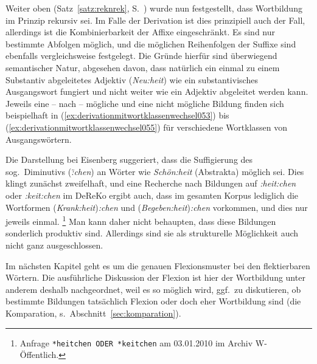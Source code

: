 Weiter oben (Satz~\ref{satz:reknrek}, S.~\pageref{satz:reknrek}) wurde nun festgestellt, dass Wortbildung im Prinzip rekursiv sei.
Im Falle der Derivation ist dies prinzipiell auch der Fall, allerdings ist die Kombinierbarkeit der Affixe eingeschränkt.
Es sind nur bestimmte Abfolgen möglich, und die möglichen Reihenfolgen der Suffixe sind ebenfalls vergleichsweise festgelegt.
Die Gründe hierfür sind überwiegend semantischer Natur, abgesehen davon, dass natürlich \zB ein einmal zu einem Substantiv abgeleitetes Adjektiv (\textit{Neu:heit}) wie ein substantivisches Ausgangswort fungiert und nicht weiter wie ein Adjektiv abgeleitet werden kann.
Jeweils eine -- nach \citealp{Eisenberg2013a} -- mögliche und eine nicht mögliche Bildung finden sich beispielhaft in (\ref{ex:derivationmitwortklassenwechsel053}) bis (\ref{ex:derivationmitwortklassenwechsel055}) für verschiedene Wortklassen von Ausgangswörtern.

\begin{exe}
\end{exe}


Die Darstellung bei Eisenberg suggeriert, dass die Suffigierung des sog.\ Diminutivs (\textit{\~:chen}) an Wörter wie \textit{Schön:heit} (Abstrakta) möglich sei.
Dies klingt zunächst zweifelhaft, und eine Recherche nach Bildungen auf \textit{:heit:chen} oder \textit{:keit:chen} im DeReKo ergibt auch, dass im gesamten Korpus lediglich die Wortformen (\textit{Krank:heit})\textit{:chen} und (\textit{Begeben:heit})\textit{:chen} vorkommen, und dies nur jeweils einmal.%
\footnote{Anfrage \texttt{*heitchen ODER *keitchen} am 03.01.2010 im Archiv W-Öffentlich.}
Man kann daher nicht behaupten, dass diese Bildungen sonderlich produktiv sind.
Allerdings sind sie als strukturelle Möglichkeit auch nicht ganz ausgeschlossen.

Im nächsten Kapitel geht es um die genauen Flexionsmuster bei den flektierbaren Wörtern.
Die ausführliche Diskussion der Flexion ist hier der Wortbildung unter anderem deshalb nachgeordnet, weil es so möglich wird, ggf.\ zu diskutieren, ob bestimmte Bildungen tatsächlich Flexion oder doch eher Wortbildung sind (\zB die Komparation, s.\ Abschnitt~\ref{sec:komparation}).


